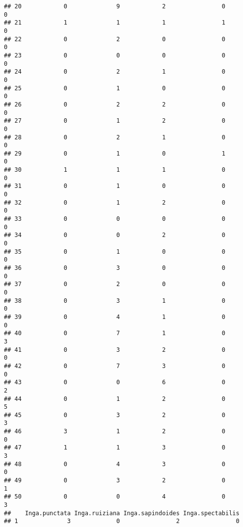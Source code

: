 \documentclass[
]{article}
\begin{document}
\begin{verbatim}
## 20            0              9            2                0               0
## 21            1              1            1                1               0
## 22            0              2            0                0               0
## 23            0              0            0                0               0
## 24            0              2            1                0               0
## 25            0              1            0                0               0
## 26            0              2            2                0               0
## 27            0              1            2                0               0
## 28            0              2            1                0               0
## 29            0              1            0                1               0
## 30            1              1            1                0               0
## 31            0              1            0                0               0
## 32            0              1            2                0               0
## 33            0              0            0                0               0
## 34            0              0            2                0               0
## 35            0              1            0                0               0
## 36            0              3            0                0               0
## 37            0              2            0                0               0
## 38            0              3            1                0               0
## 39            0              4            1                0               0
## 40            0              7            1                0               3
## 41            0              3            2                0               0
## 42            0              7            3                0               0
## 43            0              0            6                0               2
## 44            0              1            2                0               5
## 45            0              3            2                0               3
## 46            3              1            2                0               0
## 47            1              1            3                0               3
## 48            0              4            3                0               0
## 49            0              3            2                0               1
## 50            0              0            4                0               3
##    Inga.punctata Inga.ruiziana Inga.sapindoides Inga.spectabilis
## 1              3             0                2                0

\end{verbatim}
\end{document}
